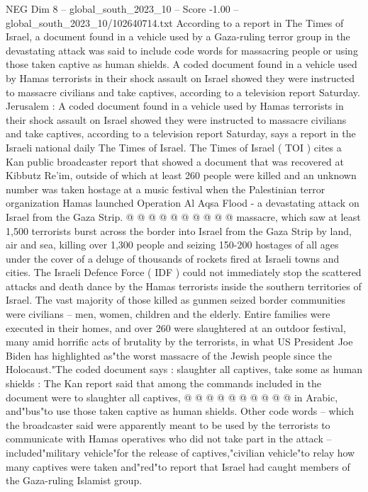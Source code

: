\begin{textsample}{NEG Dim 8 – global\_south\_2023\_10 – Score -1.00 – global\_south\_2023\_10/102640714.txt}  \label{ex:f8_neg_095}
According to a report in The Times of Israel, a document found in a vehicle used by a Gaza-ruling terror group in the devastating attack was said to include code words for massacring people or using those taken captive as human shields.
A coded document found in a vehicle used by Hamas terrorists in their shock assault on Israel showed they were instructed to massacre civilians and take captives, according to a television report Saturday.
Jerusalem : A coded document found in a vehicle used by Hamas terrorists in their shock assault on Israel showed they were instructed to massacre civilians and take captives, according to a television report Saturday, says a report in the Israeli national daily The Times of Israel.
The Times of Israel ( TOI ) cites a Kan public broadcaster report that showed a document that was recovered at Kibbutz Re'im, outside of which at least 260 people were killed and an unknown number was taken hostage at a music festival when the Palestinian terror organization Hamas launched Operation Al Aqsa Flood - a devastating attack on Israel from the Gaza Strip. @ @ @ @ @ @ @ @ @ @ massacre, which saw at least 1,500 terrorists burst across the border into Israel from the Gaza Strip by land, air and sea, killing over 1,300 people and seizing 150-200 hostages of all ages under the cover of a deluge of thousands of rockets fired at Israeli towns and cities.
The Israeli Defence Force ( IDF ) could not immediately stop the scattered attacks and death dance by the Hamas terrorists inside the southern territories of Israel.
The vast majority of those killed as gunmen seized border communities were civilians -- men, women, children and the elderly.
Entire families were executed in their homes, and over 260 were slaughtered at an outdoor festival, many amid horrific acts of brutality by the terrorists, in what US President Joe Biden has highlighted as"the worst massacre of the Jewish people since the Holocaust."The coded document says : slaughter all captives, take some as human shields : The Kan report said that among the commands included in the document were to slaughter all captives, @ @ @ @ @ @ @ @ @ @ in Arabic, and"bus"to use those taken captive as human shields.
Other code words -- which the broadcaster said were apparently meant to be used by the terrorists to communicate with Hamas operatives who did not take part in the attack -- included"military vehicle"for the release of captives,"civilian vehicle"to relay how many captives were taken and"red"to report that Israel had caught members of the Gaza-ruling Islamist group.

\end{textsample}
